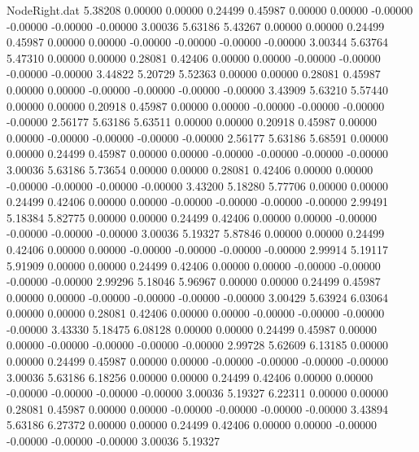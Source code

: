 \begin{filecontents}{NodeRight.dat}
   5.38208    0.00000    0.00000     0.24499    0.45987    0.00000    0.00000   -0.00000   -0.00000   -0.00000   -0.00000    3.00036    5.63186
   5.43267    0.00000    0.00000     0.24499    0.45987    0.00000    0.00000   -0.00000   -0.00000   -0.00000   -0.00000    3.00344    5.63764
   5.47310    0.00000    0.00000     0.28081    0.42406    0.00000    0.00000   -0.00000   -0.00000   -0.00000   -0.00000    3.44822    5.20729
   5.52363    0.00000    0.00000     0.28081    0.45987    0.00000    0.00000   -0.00000   -0.00000   -0.00000   -0.00000    3.43909    5.63210
   5.57440    0.00000    0.00000     0.20918    0.45987    0.00000    0.00000   -0.00000   -0.00000   -0.00000   -0.00000    2.56177    5.63186
   5.63511    0.00000    0.00000     0.20918    0.45987    0.00000    0.00000   -0.00000   -0.00000   -0.00000   -0.00000    2.56177    5.63186
   5.68591    0.00000    0.00000     0.24499    0.45987    0.00000    0.00000   -0.00000   -0.00000   -0.00000   -0.00000    3.00036    5.63186
   5.73654    0.00000    0.00000     0.28081    0.42406    0.00000    0.00000   -0.00000   -0.00000   -0.00000   -0.00000    3.43200    5.18280
   5.77706    0.00000    0.00000     0.24499    0.42406    0.00000    0.00000   -0.00000   -0.00000   -0.00000   -0.00000    2.99491    5.18384
   5.82775    0.00000    0.00000     0.24499    0.42406    0.00000    0.00000   -0.00000   -0.00000   -0.00000   -0.00000    3.00036    5.19327
   5.87846    0.00000    0.00000     0.24499    0.42406    0.00000    0.00000   -0.00000   -0.00000   -0.00000   -0.00000    2.99914    5.19117
   5.91909    0.00000    0.00000     0.24499    0.42406    0.00000    0.00000   -0.00000   -0.00000   -0.00000   -0.00000    2.99296    5.18046
   5.96967    0.00000    0.00000     0.24499    0.45987    0.00000    0.00000   -0.00000   -0.00000   -0.00000   -0.00000    3.00429    5.63924
   6.03064    0.00000    0.00000     0.28081    0.42406    0.00000    0.00000   -0.00000   -0.00000   -0.00000   -0.00000    3.43330    5.18475
   6.08128    0.00000    0.00000     0.24499    0.45987    0.00000    0.00000   -0.00000   -0.00000   -0.00000   -0.00000    2.99728    5.62609
   6.13185    0.00000    0.00000     0.24499    0.45987    0.00000    0.00000   -0.00000   -0.00000   -0.00000   -0.00000    3.00036    5.63186
   6.18256    0.00000    0.00000     0.24499    0.42406    0.00000    0.00000   -0.00000   -0.00000   -0.00000   -0.00000    3.00036    5.19327
   6.22311    0.00000    0.00000     0.28081    0.45987    0.00000    0.00000   -0.00000   -0.00000   -0.00000   -0.00000    3.43894    5.63186
   6.27372    0.00000    0.00000     0.24499    0.42406    0.00000    0.00000   -0.00000   -0.00000   -0.00000   -0.00000    3.00036    5.19327

\end{filecontents}
